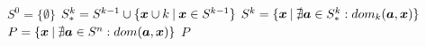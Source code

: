 \begin{algorithmic}[1] %
    \State $S^0 = \big\{\emptyset\big\}$
      \State $S_*^k = S^{k-1} \cup \{\boldsymbol{x} \cup k \:|\: \boldsymbol{x} \in S^{k-1}\}$
      \State $S^k = \{\boldsymbol{x} \:|\: \nexists \boldsymbol{a} \in S_*^k: dom_k(\boldsymbol{a}, \boldsymbol{x}) \}$
    \EndFor
  \State $P = \{\boldsymbol{x} \:|\: \nexists \boldsymbol{a} \in S^n: dom(\boldsymbol{a}, \boldsymbol{x}) \}$
  \State \Return $P$
  \EndFunction
\end{algorithmic}
